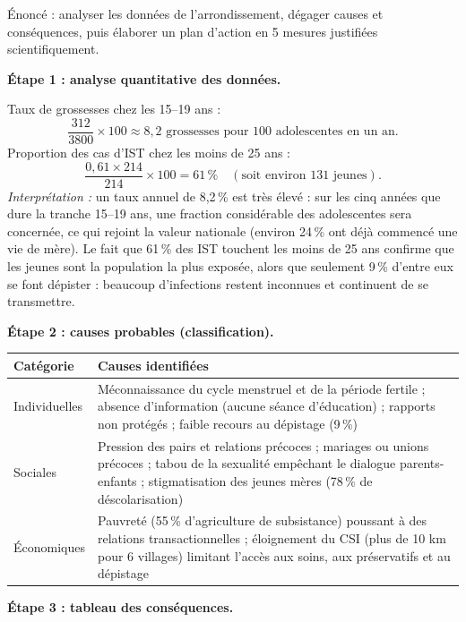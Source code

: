 \documentclass[11pt]{article}
\begin{document}
\begin{exoresolu}
Énoncé : analyser les données de l'arrondissement, dégager causes et conséquences, puis élaborer un plan d'action en 5 mesures justifiées scientifiquement.

\tcblower

\textbf{Étape 1 : analyse quantitative des données.}

Taux de grossesses chez les 15--19 ans :
\[
\frac{312}{3800} \times 100 \approx 8{,}2 \text{ grossesses pour 100 adolescentes en un an.}
\]
Proportion des cas d'IST chez les moins de 25 ans :
\[
\frac{0{,}61 \times 214}{214} \times 100 = 61\,\% \quad (\text{soit environ } 131 \text{ jeunes}).
\]
\emph{Interprétation :} un taux annuel de 8,2\,\% est très élevé : sur les cinq années que dure la tranche 15--19 ans, une fraction considérable des adolescentes sera concernée, ce qui rejoint la valeur nationale (environ 24\,\% ont déjà commencé une vie de mère). Le fait que 61\,\% des IST touchent les moins de 25 ans confirme que les jeunes sont la population la plus exposée, alors que seulement 9\,\% d'entre eux se font dépister : beaucoup d'infections restent inconnues et continuent de se transmettre.

\textbf{Étape 2 : causes probables (classification).}

\begin{center}
\begin{tabularx}{\linewidth}{|l|X|}
\hline
\rowcolor{popblueL} \textbf{Catégorie} & \textbf{Causes identifiées} \\
\hline
Individuelles & Méconnaissance du cycle menstruel et de la période fertile ; absence d'information (aucune séance d'éducation) ; rapports non protégés ; faible recours au dépistage (9\,\%) \\
\hline
Sociales & Pression des pairs et relations précoces ; mariages ou unions précoces ; tabou de la sexualité empêchant le dialogue parents-enfants ; stigmatisation des jeunes mères (78\,\% de déscolarisation) \\
\hline
Économiques & Pauvreté (55\,\% d'agriculture de subsistance) poussant à des relations transactionnelles ; éloignement du CSI (plus de 10 km pour 6 villages) limitant l'accès aux soins, aux préservatifs et au dépistage \\
\hline
\end{tabularx}
\end{center}

\textbf{Étape 3 : tableau des conséquences.}


\end{exoresolu}
\end{document}
